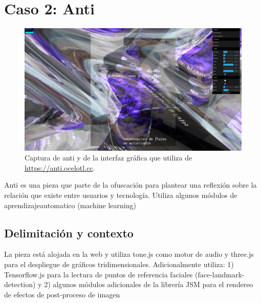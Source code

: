 \chapter{Caso 2: Anti}



\begin{figure}[tb]
\centering 
\includegraphics[width=\columnwidth]{img/anti01.png} 
\caption[Captura de Anti]{Captura de anti y de la interfaz gráfica que utiliza de \url{https://anti.ocelotl.cc}.} %
\label{fig:gallery} 
\end{figure}

Anti es una pieza que parte de la ofuscación para plantear una reflexión sobre la relación que existe entre usuarios y tecnología. Utiliza algunos módulos de \gls{aprendizajeautomatico} (machine learning) 


\section{Delimitación y contexto}

La pieza está alojada en la web y utiliza tone.js como motor de audio y three.js para el despliegue de gráficos tridimensionales. Adicionalmente utiliza: 1) Tensorflow.js para la lectura de puntos de referencia faciales (face-landmark-detection) y 2) algunos módulos adicionales de la librería JSM para el rendereo de efectos de post-proceso de imagen

